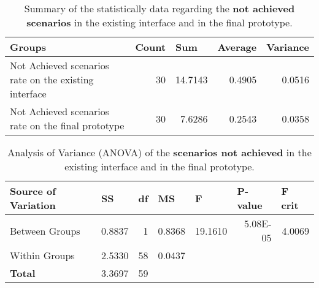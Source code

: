 \begin{table}[tb]
  \caption{Summary of the statistically data regarding the \textbf{not achieved scenarios} in the existing interface and in the final prototype.}
	\label{tab:statistical_summary_not_achieved}
  \begin{tabular}{@{}m{5cm}rrrr@{}}
  \toprule
  \textbf{Groups}                                       & \multicolumn{1}{l}{\textbf{Count}} & \multicolumn{1}{l}{\textbf{Sum}} & \multicolumn{1}{l}{\textbf{Average}} & \multicolumn{1}{l}{\textbf{Variance}} \\ \midrule
  Not Achieved scenarios rate on the existing interface & 30                                 & 14.7143                          & 0.4905                               & 0.0516                                \\
  Not Achieved scenarios rate on the final prototype    & 30                                 & 7.6286                           & 0.2543                               & 0.0358                                \\ \bottomrule
  \end{tabular}
  \end{table}


\begin{table}[tb]
  \caption{Analysis of Variance (ANOVA) of the \textbf{scenarios not achieved} in the existing interface and in the final prototype.}
	\label{tab:anova_not_achieved}
  \begin{tabular}{@{}lrrllll@{}}
  \toprule
  \textbf{Source of Variation} & \multicolumn{1}{l}{\textbf{SS}} & \multicolumn{1}{l}{\textbf{df}} & \textbf{MS}                & \textbf{F}                  & \textbf{P-value}             & \textbf{F crit}            \\ \midrule
  Between Groups               & 0.8837                          & 1                               & \multicolumn{1}{r}{0.8368} & \multicolumn{1}{r}{19.1610} & \multicolumn{1}{r}{5.08E-05} & \multicolumn{1}{r}{4.0069} \\
  Within Groups                & 2.5330                          & 58                              & \multicolumn{1}{r}{0.0437} &                             &                              &                            \\ \midrule
  \textbf{Total}               & 3.3697                          & 59                              &                            &                             &                              &                            \\ \bottomrule
  \end{tabular}
  \end{table}


